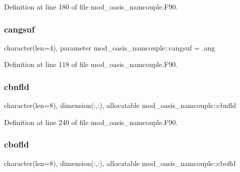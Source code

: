 Definition at line 180 of file mod\+\_\+oasis\+\_\+namcouple.\+F90.

\mbox{\label{namespacemod__oasis__namcouple_a4b921aeee4d921557ab0cd2f0e541dad}} 
\subsubsection{\texorpdfstring{cangsuf}{cangsuf}}
{\footnotesize\ttfamily character(len=4), parameter mod\+\_\+oasis\+\_\+namcouple\+::cangsuf = \textquotesingle{}.ang\textquotesingle{}\hspace{0.3cm}{\ttfamily [private]}}



Definition at line 118 of file mod\+\_\+oasis\+\_\+namcouple.\+F90.

\mbox{\label{namespacemod__oasis__namcouple_af5bfb0fe58a77461130b9967fa7a4d5e}} 
\subsubsection{\texorpdfstring{cbnfld}{cbnfld}}
{\footnotesize\ttfamily character(len=8), dimension(\+:,\+:), allocatable mod\+\_\+oasis\+\_\+namcouple\+::cbnfld\hspace{0.3cm}{\ttfamily [private]}}



Definition at line 240 of file mod\+\_\+oasis\+\_\+namcouple.\+F90.

\mbox{\label{namespacemod__oasis__namcouple_ab0f93bb917e445dc4e55fc2326168a42}} 
\subsubsection{\texorpdfstring{cbofld}{cbofld}}
{\footnotesize\ttfamily character(len=8), dimension(\+:,\+:), allocatable mod\+\_\+oasis\+\_\+namcouple\+::cbofld\hspace{0.3cm}{\ttfamily [private]}}



